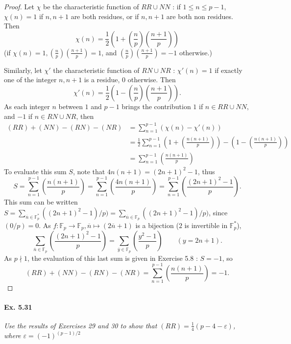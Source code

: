 \documentclass[11pt,a4paper]{article}
\newcommand{\F}{\mathbb{F}}
\newcommand{\legendre}[2]{\genfrac{(}{)}{}{}{#1}{#2}}
\begin{document}
\begin{proof}
Let $\chi$ be  the characteristic function of $RR \cup NN$ : if $1 \leq n \leq p-1$,
$\chi(n) = 1$ if $n,n+1$ are both  residues, or if $n,n+1$ are both non residues. Then 
$$\chi(n) = \frac{1}{2} \left( 1 + \legendre{n}{p} \legendre{n+1}{p} \right) $$
(if $\chi(n) = 1, \legendre{n}{p} \legendre{n+1}{p} = 1$, and $\legendre{n}{p} \legendre{n+1}{p} = -1$ otherwise.)

Similarly, let $\chi'$ the characteristic function of $RN \cup NR$ : $\chi'(n) =1$ if exactly one of the integer $n,n+1$ is a residue, $0$ otherwise. Then 
$$\chi'(n) = \frac{1}{2} \left( 1 - \legendre{n}{p} \legendre{n+1}{p} \right).$$
As each integer $n$ between $1$ and $p-1$ brings the contribution $1$ if $n \in RR \cup NN$, and $-1$ if $n \in RN \cup NR$, then
\begin{align*}
(RR) + (NN) - (RN) - (NR) &= \sum_{n=1}^{p-1} (\chi(n) - \chi'(n))\\
&= \frac{1}{2} \sum_{n=1}^{p-1}  \left( 1 + \legendre{n(n+1)}{p}  \right)  - \left( 1 - \legendre{n(n+1)}{p}  \right) \\
&= \sum_{n=1}^{p-1}   \legendre{n(n+1)}{p}  
\end{align*}
To evaluate this sum $S$, note that $4n(n+1) = (2n+1)^2 - 1$, thus
$$S = \sum_{n=1}^{p-1}   \legendre{n(n+1)}{p} = \sum_{n=1}^{p-1}   \legendre{4n(n+1)}{p} = \sum_{n=1}^{p-1}   \legendre{(2n+1)^2 - 1}{p}.$$
This sum can be written $ S = \sum_{\overline{n} \in \F_p^*} ((2n+1)^2 - 1)/p)= \sum_{\overline{n} \in \F_p} ((2n+1)^2 - 1)/p)$, since $(0/p) = 0$.
As $f : \F_p \to \F_p, \overline{n} \mapsto (2\overline{n}+1)$ is a bijection ($2$ is invertible in $\F_p^*$),
$$\sum_{\overline{n} \in \F_p} \legendre{(2n+1)^2 - 1}{p}  = \sum_{\overline{y} \in \F_p} \legendre{y^2 - 1}{p}\qquad (y = 2n+1).$$
As $p \nmid 1$, the evaluation of this last sum is given in Exercise 5.8 : $S = -1$, so 
$$ (RR) + (NN) - (RN) - (NR)  = \sum_{n=1}^{p-1}   \legendre{n(n+1)}{p}  = -1.$$
\end{proof}

\paragraph{Ex. 5.31}
{\it Use the results of Exercises 29 and 30 to show that $(RR) = \frac{1}{4}(p-4-\varepsilon)$, where $\varepsilon = (-1)^{(p-1)/2}$
}
\end{document}
